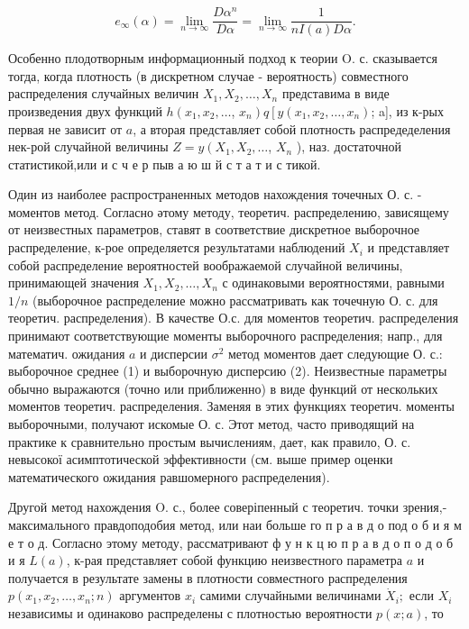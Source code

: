 \documentclass[10pt]{article}
\begin{document}
\[

e_{\infty}(\alpha)=\lim _{n \rightarrow \infty} \frac{D \alpha^{n}}{D \alpha}=\lim _{n \rightarrow \infty} \frac{1}{n I(a) D \alpha} .

\]



Особенно плодотворным информационный подход к теории O. с. сказывается тогда, когда плотность (в дискретном случае - вероятность) совместного распределения случайных величин $X_{1}, X_{2}, \ldots, X_{n}$ представима в виде произведения двух функций $h\left(x_{1}, x_{2}, \ldots\right.$, $\left.x_{n}\right) q\left[y\left(x_{1}, x_{2}, \ldots, x_{n}\right)\right.$; a], из к-рых первая не зависит от $a$, а вторая представляет собой плотность распредеделения нек-рой случайной величины $Z=y\left(X_{1}, X_{2}, \ldots\right.$, $X_{n}$ ), наз. достаточной статистикой,или и с ч е р пыв а ю ш й с т а т и с тикой.



Один из наиболее распространенных методов нахождения точечных О. с. - моментов метод. Согласно әтому методу, теоретич. распределению, зависящему от неизвестных параметров, ставят в соответствие дискретное выборочное распределение, к-рое определяется результатами наблюдений $X_{i}$ и представляет собой распределение вероятностей воображаемой случайной величины, принимающей значения $X_{1}, X_{2}, \ldots, X_{n}$ с одинаковыми вероятностями, равными $1 / n$ (выборочное распределение можно рассматривать как точечную О. с. для теоретич. распределения). В качестве О.с. для моментов теоретич. распределения принимают соответствующие моменты выборочного распределения; напр., для математич. ожидания $a$ и дисперсии $\sigma^{2}$ метод моментов дает следующие О. с.: выборочное среднее (1) и выборочную дисперсию (2). Неизвестные параметры обычно выражаются (точно или приближенно) в виде функций от нескольких моментов теоретич. распределения. Заменяя в этих функциях теоретич. моменты выборочными, получают искомые О. с. Этот метод, часто приводящий на практике к сравнительно простым вычислениям, дает, как правило, О. с. невысокої асимптотической эффективности (см. выше пример оценки математического ожидания равшомерного распределения).



Другой метод нахождения O. с., более соверіпенный с теоретич. точки зрения,- максимального правдоподобия метод, или наи больше го п р а в д о под о б и я м е т о д. Согласно этому методу, рассматривают ф у н к ц ю п р а в д о п о д о б и я $L(a)$, к-рая представляет собой функцию неизвестного параметра $a$ и получается в результате замены в плотности совместного распределения $p\left(x_{1}, x_{2}, \ldots, x_{n} ; n\right)$ аргументов $x_{i}$ самими случайными величинами $\dot{X}_{i} ;$ если $X_{i}$ независимы и одинаково распределены с плотностью вероятности $p(x ; a)$, то
\end{document}
